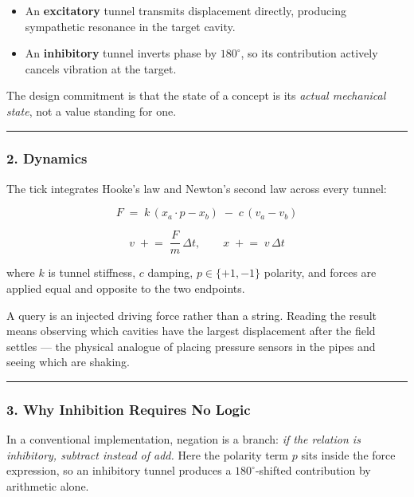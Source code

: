 \documentclass[
  11pt,
  a4paper,
]{article}
\providecommand{\tightlist}{%
  \setlength{\itemsep}{0pt}\setlength{\parskip}{0pt}}
\begin{document}
\begin{itemize}
\tightlist
\item
  An \textbf{excitatory} tunnel transmits displacement directly,
  producing sympathetic resonance in the target cavity.
\item
  An \textbf{inhibitory} tunnel inverts phase by \(180^\circ\), so its
  contribution actively cancels vibration at the target.
\end{itemize}

The design commitment is that the state of a concept is its \emph{actual
mechanical state}, not a value standing for one.

\begin{center}\rule{0.5\linewidth}{0.5pt}\end{center}

\subsubsection{2. Dynamics}\label{dynamics}

The tick integrates Hooke's law and Newton's second law across every
tunnel:

\[
F \;=\; k\,(x_a \cdot p - x_b)\;-\;c\,(v_a - v_b)
\]

\[
v \;\mathrel{+}=\; \frac{F}{m}\,\Delta t,
\qquad
x \;\mathrel{+}=\; v\,\Delta t
\]

where \(k\) is tunnel stiffness, \(c\) damping, \(p \in \{+1,-1\}\)
polarity, and forces are applied equal and opposite to the two
endpoints.

A query is an injected driving force rather than a string. Reading the
result means observing which cavities have the largest displacement
after the field settles --- the physical analogue of placing pressure
sensors in the pipes and seeing which are shaking.

\begin{center}\rule{0.5\linewidth}{0.5pt}\end{center}

\subsubsection{3. Why Inhibition Requires No
Logic}\label{why-inhibition-requires-no-logic}

In a conventional implementation, negation is a branch: \emph{if the
relation is inhibitory, subtract instead of add.} Here the polarity term
\(p\) sits inside the force expression, so an inhibitory tunnel produces
a \(180^\circ\)-shifted contribution by arithmetic alone.
\end{document}
